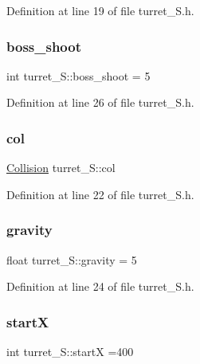 Definition at line 19 of file turret\+\_\+\+S.\+h.

\hypertarget{classturret___s_a87dbfe5ad2e53ed8b946ebd1a11a9190}{}\label{classturret___s_a87dbfe5ad2e53ed8b946ebd1a11a9190} 
\subsubsection{\texorpdfstring{boss\+\_\+shoot}{boss\_shoot}}
{\footnotesize\ttfamily int turret\+\_\+\+S\+::boss\+\_\+shoot = 5}



Definition at line 26 of file turret\+\_\+\+S.\+h.

\hypertarget{classturret___s_a2a4209e21831ca2879cdb6bf783db73c}{}\label{classturret___s_a2a4209e21831ca2879cdb6bf783db73c} 
\subsubsection{\texorpdfstring{col}{col}}
{\footnotesize\ttfamily \hyperlink{class_collision}{Collision} turret\+\_\+\+S\+::col}



Definition at line 22 of file turret\+\_\+\+S.\+h.

\hypertarget{classturret___s_ac1b492d440c46adde5099139500d834a}{}\label{classturret___s_ac1b492d440c46adde5099139500d834a} 
\subsubsection{\texorpdfstring{gravity}{gravity}}
{\footnotesize\ttfamily float turret\+\_\+\+S\+::gravity = 5}



Definition at line 24 of file turret\+\_\+\+S.\+h.

\hypertarget{classturret___s_a115cdd63d3d1db66a45c1854af642458}{}\label{classturret___s_a115cdd63d3d1db66a45c1854af642458} 
\subsubsection{\texorpdfstring{startX}{startX}}
{\footnotesize\ttfamily int turret\+\_\+\+S\+::startX =400}



